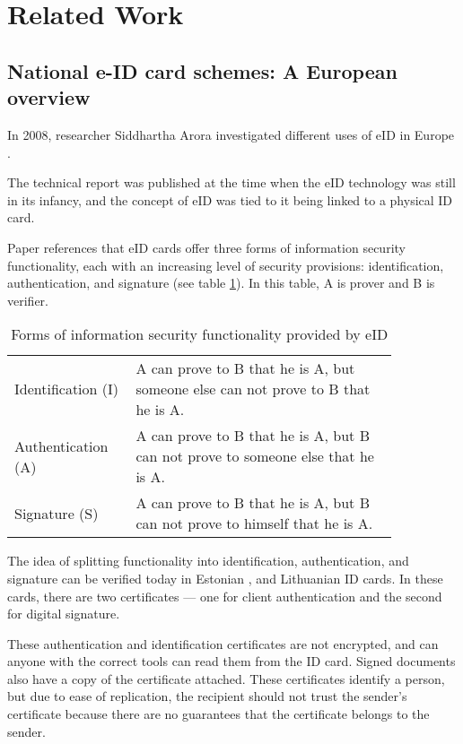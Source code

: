 \section{Related Work}

\subsection{National e-ID card schemes: A European overview}

In 2008, researcher Siddhartha Arora investigated different uses of eID in Europe \cite{ARORA200846}.

The technical report was published at the time when the eID technology was still in its infancy, and the concept of eID was tied to it being linked to a physical ID card.

Paper references that eID cards offer three forms of information security functionality, each with an increasing level of security provisions: identification, authentication, and signature (see table \ref{tab:formsofinfosecurity}). In this table, A is prover and B is verifier.

\begin{table}[h]
    \begin{center}
        \caption{Forms of information security functionality provided by eID \cite{ARORA200846, fiat1986prove}}
        \label{tab:formsofinfosecurity}
        \begin{tabular}{p{0.25\linewidth} | p{0.6\linewidth}}
            Identification (I) & A can prove to B that he is A, but someone else can not prove to B that he is A. \\
            Authentication (A) & A can prove to B that he is A, but B can not prove to someone else that he is A. \\
            Signature (S)      & A can prove to B that he is A, but B can not prove to himself that he is A.
        \end{tabular}
    \end{center}
\end{table}

The idea of splitting functionality into identification, authentication, and signature can be verified today in Estonian \cite{ee-id-tech}, and Lithuanian \cite{lt-id-howtouse} ID cards. In these cards, there are two certificates — one for client authentication and the second for digital signature.

These authentication and identification certificates are not encrypted, and can anyone with the correct tools can read them from the ID card. Signed documents also have a copy of the certificate attached. These certificates identify a person, but due to ease of replication, the recipient should not trust the sender's certificate because there are no guarantees that the certificate belongs to the sender.

